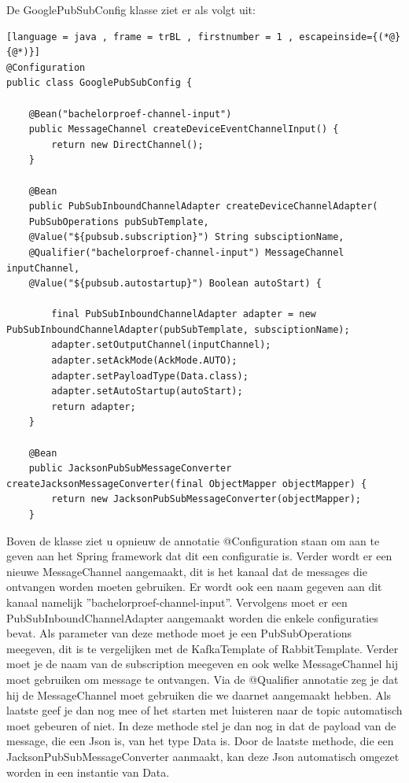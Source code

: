De GooglePubSubConfig klasse ziet er als volgt uit:
\begin{lstlisting}[language = java , frame = trBL , firstnumber = 1 , escapeinside={(*@}{@*)}]
@Configuration
public class GooglePubSubConfig {
    
    @Bean("bachelorproef-channel-input")
    public MessageChannel createDeviceEventChannelInput() {
        return new DirectChannel();
    }
    
    @Bean
    public PubSubInboundChannelAdapter createDeviceChannelAdapter(
    PubSubOperations pubSubTemplate,
    @Value("${pubsub.subscription}") String subsciptionName,
    @Qualifier("bachelorproef-channel-input") MessageChannel inputChannel,
    @Value("${pubsub.autostartup}") Boolean autoStart) {
        
        final PubSubInboundChannelAdapter adapter = new PubSubInboundChannelAdapter(pubSubTemplate, subsciptionName);
        adapter.setOutputChannel(inputChannel);
        adapter.setAckMode(AckMode.AUTO);
        adapter.setPayloadType(Data.class);
        adapter.setAutoStartup(autoStart);
        return adapter;
    }
    
    @Bean
    public JacksonPubSubMessageConverter createJacksonMessageConverter(final ObjectMapper objectMapper) {
        return new JacksonPubSubMessageConverter(objectMapper);
    }
\end{lstlisting}
Boven de klasse ziet u opnieuw de annotatie @Configuration staan om aan te geven aan het Spring framework dat dit een configuratie is. Verder wordt er een nieuwe MessageChannel aangemaakt, dit is het kanaal dat de messages die ontvangen worden moeten gebruiken. Er wordt ook een naam gegeven aan dit kanaal namelijk ''bachelorproef-channel-input''. Vervolgens moet er een PubSubInboundChannelAdapter aangemaakt worden die enkele configuraties bevat. Als parameter van deze methode moet je een PubSubOperations meegeven, dit is te vergelijken met de KafkaTemplate of RabbitTemplate. Verder moet je de naam van de subscription meegeven en ook welke MessageChannel hij moet gebruiken om message te ontvangen. Via de @Qualifier annotatie zeg je dat hij de MessageChannel moet gebruiken die we daarnet aangemaakt hebben. Als laatste geef je dan nog mee of het starten met luisteren naar de topic automatisch moet gebeuren of niet. In deze methode stel je dan nog in dat de payload van de message, die een Json is, van het type Data is. Door de laatste methode, die een JacksonPubSubMessageConverter aanmaakt, kan deze Json automatisch omgezet worden in een instantie van Data.
